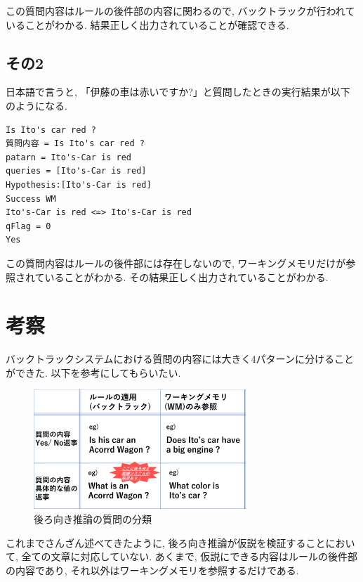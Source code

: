\documentclass[uplatex,12pt]{jsarticle}
\begin{document}
この質問内容はルールの後件部の内容に関わるので, バックトラックが行われていることがわかる. 結果正しく出力されていることが確認できる.

\subsection{その2}
日本語で言うと, 「伊藤の車は赤いですか?」と質問したときの実行結果が以下のようになる.
\begin{lstlisting}
Is Ito's car red ?
質問内容 = Is Ito's car red ?
patarn = Ito's-Car is red
queries = [Ito's-Car is red]
Hypothesis:[Ito's-Car is red]
Success WM
Ito's-Car is red <=> Ito's-Car is red
qFlag = 0
Yes
\end{lstlisting}

この質問内容はルールの後件部には存在しないので, ワーキングメモリだけが参照されていることがわかる. その結果正しく出力されていることがわかる.



\section{考察}
バックトラックシステムにおける質問の内容には大きく4パターンに分けることができた. 以下を参考にしてもらいたい.

\begin{figure}[htbp]
 \begin{center}
  \includegraphics[width = 8cm, pagebox = cropbox, clip]{images/後ろ向き推論の質問の分類.pdf}
 \end{center}
 \caption[]{後ろ向き推論の質問の分類}\label{fig:fig1.1}
\end{figure}

これまでさんざん述べてきたように, 後ろ向き推論が仮説を検証することにおいて, 全ての文章に対応していない. あくまで, 仮説にできる内容はルールの後件部の内容であり, それ以外はワーキングメモリを参照するだけである.
\end{document}
